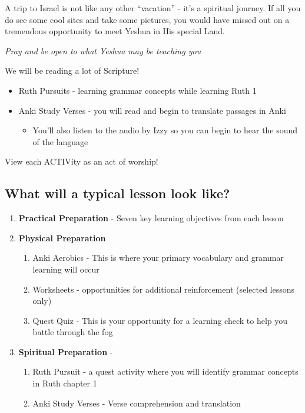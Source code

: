 \documentclass[
]{turabian-researchpaper}
\providecommand{\tightlist}{%
  \setlength{\itemsep}{0pt}\setlength{\parskip}{0pt}}
\begin{document}
A trip to Israel is not like any other ``vacation'' - it's a spiritual journey. If all you do see some cool sites and take some pictures, you would have missed out on a tremendous opportunity to meet Yeshua in His special Land.

\emph{Pray and be open to what Yeshua may be teaching you}

We will be reading a lot of Scripture!

\begin{itemize}
\tightlist
\item
  Ruth Pursuits - learning grammar concepts while learning Ruth 1
\item
  Anki Study Verses - you will read and begin to translate passages in Anki

  \begin{itemize}
  \tightlist
  \item
    You'll also listen to the audio by Izzy so you can begin to hear the sound of the language
  \end{itemize}
\end{itemize}

View each ACTIVity as an act of worship!

\hypertarget{what-will-a-typical-lesson-look-like}{%
\subsection*{What will a typical lesson look like?}\label{what-will-a-typical-lesson-look-like}}

\begin{enumerate}
\def\labelenumi{\arabic{enumi}.}
\item
  \textbf{Practical Preparation} - Seven key learning objectives from each lesson
\item
  \textbf{Physical Preparation}

  \begin{enumerate}
  \def\labelenumii{\arabic{enumii}.}
  \tightlist
  \item
    Anki Aerobics - This is where your primary vocabulary and grammar learning will occur
  \item
    Worksheets - opportunities for additional reinforcement (selected lessons only)
  \item
    Quest Quiz - This is your opportunity for a learning check to help you battle through the fog
  \end{enumerate}
\item
  \textbf{Spiritual Preparation} -

  \begin{enumerate}
  \def\labelenumii{\arabic{enumii}.}
  \tightlist
  \item
    Ruth Pursuit - a quest activity where you will identify grammar concepts in Ruth chapter 1
  \item
    Anki Study Verses - Verse comprehension and translation
  \end{enumerate}
\end{enumerate}
\end{document}
